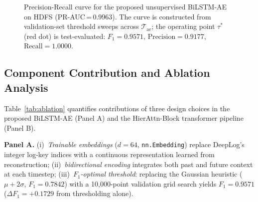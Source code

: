 \documentclass{elektr}
\begin{document}
\begin{figure}[h!]
\begin{center}
\caption{Precision-Recall curve for the proposed unsupervised BiLSTM-AE on HDFS
(PR-AUC\,=\,0.9963). The curve is constructed from validation-set threshold sweeps
across $\mathcal{T}_{\text{ae}}$; the operating point $\tau^*$ (red dot) is
test-evaluated: $F_1{=}0.9571$, $\text{Precision}{=}0.9177$, $\text{Recall}{=}1.0000$.}
\label{fig:pr_curve}
\end{center}\vs{-4mm}
\end{figure}

\subsection{Component Contribution and Ablation Analysis}
\label{Sec:Ablation}

Table~\ref{tab:ablation} quantifies contributions of three design choices in the proposed BiLSTM-AE (Panel A) and the HierAttn-Block transformer pipeline (Panel B).

\textbf{Panel A.} (i)~\emph{Trainable embeddings} ($d{=}64$, \texttt{nn.Embedding}) replace DeepLog's integer log-key indices with a continuous representation learned from reconstruction; (ii)~\emph{bidirectional encoding} integrates both past and future context at each timestep; (iii)~\emph{$F_1$-optimal threshold}: replacing the Gaussian heuristic ($\mu{+}2\sigma$, $F_1{=}0.7842$) with a 10,000-point validation grid search yields $F_1{=}0.9571$ ($\Delta F_1{=}+0.1729$ from thresholding alone).
\end{document}
